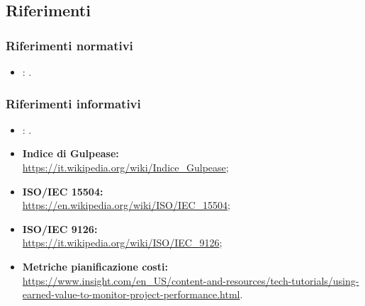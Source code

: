 \subsection{Riferimenti}

\subsubsection{Riferimenti normativi}
\begin{itemize}
	\item \textbf{\NdP}: .
\end{itemize}

\subsubsection{Riferimenti informativi}
\sloppy
\begin{itemize}
	\item \textbf{\PdP}: .
	\item \textbf{Indice di Gulpease:}\\
	\url{https://it.wikipedia.org/wiki/Indice_Gulpease};
	\item \textbf{ISO/IEC 15504:}\\
	\url{https://en.wikipedia.org/wiki/ISO/IEC_15504};
	\item \textbf{ISO/IEC 9126:}\\
	\url{https://it.wikipedia.org/wiki/ISO/IEC_9126};
	\item \textbf{Metriche pianificazione costi:}\\
	\url{https://www.insight.com/en_US/content-and-resources/tech-tutorials/using-earned-value-to-monitor-project-performance.html}.
\end{itemize}
\fussy